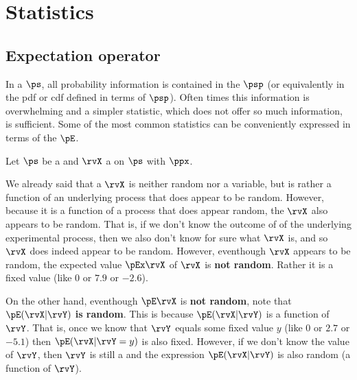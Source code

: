 \chapter{Statistics}
\label{chp:stats}
\section{Expectation operator}
In a  $\ps$, all probability information
is contained in the  $\psp$ (or equivalently in the pdf or cdf
defined in terms of $\psp$).
Often times this information is overwhelming and a simpler statistic,
which does not offer so much information, is sufficient.
Some of the most common statistics can be conveniently expressed in terms
of the  $\pE$.
\begin{definition}
\label{def:pE}
Let $\ps$ be a  and
$\rvX$ a  on $\ps$ with
 $\ppx$.
\end{definition}

We already said that a  $\rvX$ is neither random nor a variable,
but is rather a function of an underlying process that does appear to be random.
However, because it is a function of a process that does appear random,
the  $\rvX$ also appears to be random.
That is, if we don't know the outcome of of the underlying experimental
process, then we also don't know for sure what $\rvX$ is, and so $\rvX$ does
indeed appear to be random.
However, eventhough $\rvX$ appears to be random,
the expected value $\pEx\rvX$  of $\rvX$ is {\bf not random}.
Rather it is a fixed value (like $0$ or $7.9$ or $-2.6$).

On the other hand, eventhough $\pE\rvX$ is {\bf not random},
note that $\pE(\rvX|\rvY)$ {\bf is random}.
This is because $\pE(\rvX|\rvY)$ is a function of $\rvY$.
That is, once we know that $\rvY$ equals some fixed value $y$
(like $0$ or $2.7$ or $-5.1$) then $\pE(\rvX|\rvY=y)$ is also fixed.
However, if we don't know the value of $\rvY$,
then $\rvY$ is still a  and the expression $\pE(\rvX|\rvY)$
is also random (a function of  $\rvY$).

